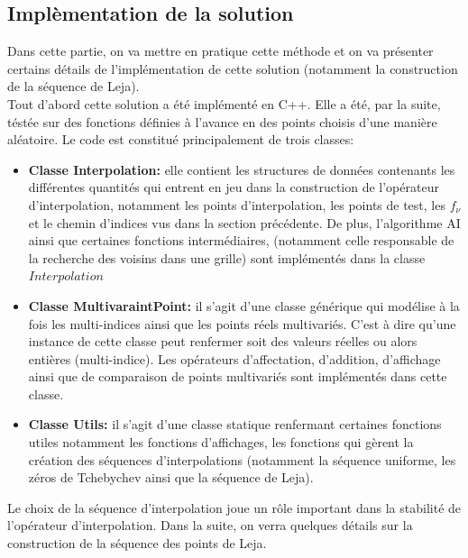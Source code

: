 \subsection{Implèmentation de la solution}\label{sec:5}
Dans cette partie, on va mettre en pratique cette méthode et on va présenter certains détails
de l'implémentation de cette solution (notamment la construction de la séquence de Leja).\\

Tout d'abord cette solution a été implémenté en C++. Elle a été, par la suite, téstée sur
des fonctions définies à l'avance en des points choisis d'une manière aléatoire.
Le code est constitué principalement de trois classes:
\begin{itemize}
		\item \textbf{Classe Interpolation:} elle contient les structures de données contenants les différentes quantités qui entrent
		en jeu dans la construction de l'opérateur d'interpolation, notamment les points d'interpolation, les points de test,
		les $f_{\nu}$ et le chemin d'indices vus dans la section précédente. De plus, l'algorithme AI ainsi que certaines fonctions intermédiaires,
		(notamment celle responsable de la recherche des voisins dans une grille) sont implémentés dans la classe $Interpolation$
		\item \textbf{Classe MultivaraintPoint:} il s'agit d'une classe générique qui modélise à la fois les multi-indices ainsi que les points réels multivariés.
		C'est à dire qu'une instance de cette classe peut renfermer soit des valeurs réelles ou alors entières (multi-indice). Les opérateurs d'affectation,
		d'addition, d'affichage ainsi que de comparaison de points multivariés sont implémentés dans cette classe.
		\item \textbf{Classe Utils:} il s'agit d'une classe statique renfermant certaines fonctions utiles notamment les fonctions d'affichages,
		les fonctions qui gèrent la création des séquences d'interpolations (notamment la séquence uniforme, les zéros de Tchebychev ainsi que la séquence de Leja).
\end{itemize}

Le choix de la séquence d'interpolation joue un rôle important dans la stabilité de l'opérateur d'interpolation. Dans la suite, on verra quelques détails
sur la construction de la séquence des points de Leja.
